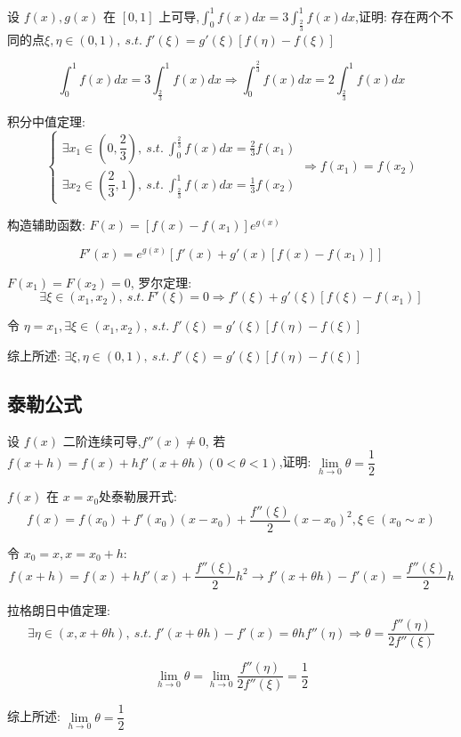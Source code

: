 \begin{proposition}
	设 $f(x),g(x)$ 在 $[0,1]$ 上可导,$\displaystyle{\int_{0}^{1}f(x)dx=3\int_{\frac{2}{3}}^{1}f(x)dx}$,证明: 存在两个不同的点$\xi,\eta\in(0,1),\ s.t.\ f'(\xi)=g'(\xi)[f(\eta)-f(\xi)]$
\end{proposition}
\begin{solution}

	$$\int_{0}^{1}f(x)dx=3\int_{\frac{2}{3}}^{1}f(x)dx\Rightarrow \int_{0}^{\frac{2}{3}}f(x)dx=2\int_{\frac{2}{3}}^{1}f(x)dx$$

	积分中值定理:
	$$\begin{cases}
		\exists x_{1}\in(0,\dfrac{2}{3}),\ s.t.\ \displaystyle{\int_{0}^{\frac{2}{3}}f(x)dx=\frac{2}{3}f(x_{1})} \\
		\exists x_{2}\in(\dfrac{2}{3},1),\ s.t.\ \displaystyle{\int_{\frac{2}{3}}^{1}f(x)dx=\frac{1}{3}f(x_{2})}
	\end{cases}\Rightarrow f(x_{1})=f(x_{2})$$

	构造辅助函数: $F(x)=[f(x)-f(x_{1})]e^{g(x)}$

	$$F'(x)=e^{g(x)}\left[f'(x)+g'(x)[f(x)-f(x_{1})]\right]$$

	$F(x_{1}) = F(x_{2}) = 0$, 罗尔定理:
	$$\exists \xi\in(x_{1},x_{2}),\ s.t.\ F'(\xi)=0\Rightarrow f'(\xi)+g'(\xi)[f(\xi)-f(x_{1})]$$

	令 $\eta=x_{1},\exists \xi\in(x_{1},x_{2}),\ s.t.\ f'(\xi)=g'(\xi)[f(\eta)-f(\xi)]$

	综上所述: $\exists \xi,\eta\in(0,1),\ s.t.\ f'(\xi)=g'(\xi)[f(\eta)-f(\xi)]$

\end{solution}

\subsection{泰勒公式}

\begin{proposition}
	设 $f(x)$ 二阶连续可导,$f''(x)\neq 0$, 若 $f(x+h)=f(x)+ h f'(x+\theta h)(0<\theta<1)$,证明: $\lim\limits_{h\to 0 }\theta=\dfrac{1}{2}$
\end{proposition}
\begin{solution}

	$f(x)$ 在 $x = x_{0}$处泰勒展开式:
	$$f(x) = f(x_{0}) + f'(x_{0})(x-x_{0}) + \dfrac{f''(\xi)}{2}(x-x_{0})^{2}, \xi\in(x_{0}\sim x)$$

	令 $x_{0} = x, x = x_{0} + h$:
	$$f(x+h) = f(x) + hf'(x) + \dfrac{f''(\xi)}{2}h^{2}\to f'(x+\theta h) -f'(x) = \dfrac{f''(\xi)}{2}h$$
	
	拉格朗日中值定理:
	$$\exists\eta \in(x,x+\theta h),\ s.t.\ f'(x+\theta h) - f'(x)=\theta hf''(\eta)\Rightarrow \theta=\dfrac{f''(\eta)}{2f''(\xi)}$$

	$$\lim\limits_{h\to 0 }\theta=\lim\limits_{h\to 0 }\dfrac{f''(\eta)}{2f''(\xi)}=\dfrac{1}{2}$$

	综上所述: $\lim\limits_{h\to 0 }\theta=\dfrac{1}{2}$
\end{solution}

